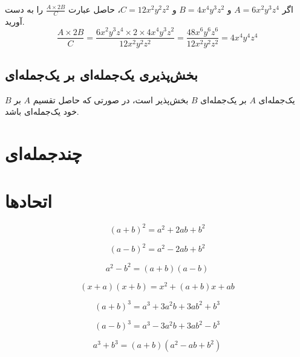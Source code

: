 \begin{example}
	اگر
	$A = 6x^2y^3z^4$
	و
	$B = 4x^4y^3z^2$
	و
	$C = 12x^2y^2z^2$،
	حاصل عبارت
	$\frac{A \times 2B}{C}$
	را به دست آورید. \\
	\begin{equation*}
		\frac{A \times 2B}{C} = \frac{6x^2y^3z^4 \times 2 \times 4x^4y^3z^2}{12x^2y^2z^2} = \frac{48x^6y^6z^6}{12x^2y^2z^2} = 4x^4y^4z^4
	\end{equation*}
\end{example}

\subsection{بخش‌پذیری یک‌جمله‌ای بر یک‌جمله‌ای}
یک‌جمله‌ای $A$ بر یک‌جمله‌ای $B$ بخش‌پذیر است، در صورتی که حاصل تقسیم $A$ بر $B$ خود یک‌جمله‌ای باشد.

\section{چندجمله‌ای}

\section{اتحادها}

\begin{equation}
	(a+b)^2 = a^2+2ab+b^2
\end{equation}

\begin{equation}
	(a-b)^2 = a^2-2ab+b^2
\end{equation}

\begin{equation}
	a^2-b^2 = (a+b)(a-b)
\end{equation}

\begin{equation}
	(x+a)(x+b) = x^2+(a+b)x+ab
\end{equation}

\begin{equation}
	(a+b)^3 = a^3+3a^2b+3ab^2+b^3
\end{equation}

\begin{equation}
	(a-b)^3 = a^3-3a^2b+3ab^2-b^3
\end{equation}

\begin{equation}
	a^3+b^3 = (a+b)(a^2-ab+b^2)
\end{equation}

